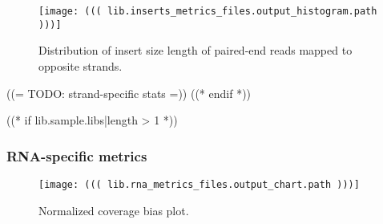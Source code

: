 {
    \begin{figure}[h!]
        \centering
        \texttt{[image: ((( lib.inserts\_metrics\_files.output\_histogram.path )))]}
        \caption{Distribution of insert size length of paired-end reads mapped to opposite strands.}
    \end{figure}
}
((= TODO: strand-specific stats
=))
((* endif *))

((* if lib.sample.libs|length > 1 *))
\subsubsection{RNA-specific metrics}

{
    \begin{figure}[h!]
        \centering
        \texttt{[image: ((( lib.rna\_metrics\_files.output\_chart.path )))]}
        \caption{Normalized coverage bias plot.}
    \end{figure}
}

